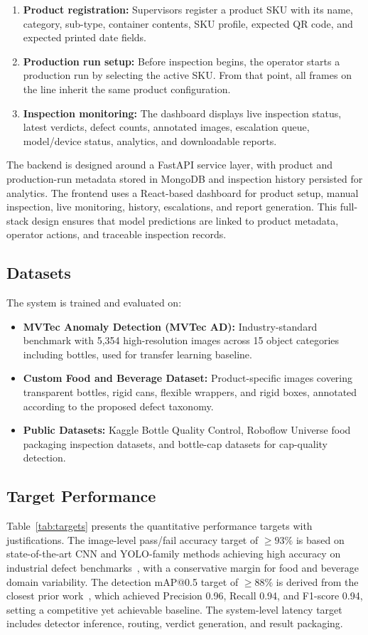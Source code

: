 \documentclass{ieeeaccess}
\begin{document}
\begin{enumerate}
    \item \textbf{Product registration:} Supervisors register a product SKU with its name, category, sub-type, container contents, SKU profile, expected QR code, and expected printed date fields.
    \item \textbf{Production run setup:} Before inspection begins, the operator starts a production run by selecting the active SKU. From that point, all frames on the line inherit the same product configuration.
    \item \textbf{Inspection monitoring:} The dashboard displays live inspection status, latest verdicts, defect counts, annotated images, escalation queue, model/device status, analytics, and downloadable reports.
\end{enumerate}

The backend is designed around a FastAPI service layer, with product and production-run metadata stored in MongoDB and inspection history persisted for analytics. The frontend uses a React-based dashboard for product setup, manual inspection, live monitoring, history, escalations, and report generation. This full-stack design ensures that model predictions are linked to product metadata, operator actions, and traceable inspection records.

\subsection{Datasets}
The system is trained and evaluated on:
\begin{itemize}
    \item \textbf{MVTec Anomaly Detection (MVTec AD):} Industry-standard benchmark with 5,354 high-resolution images across 15 object categories including bottles, used for transfer learning baseline.
    \item \textbf{Custom Food and Beverage Dataset:} Product-specific images covering transparent bottles, rigid cans, flexible wrappers, and rigid boxes, annotated according to the proposed defect taxonomy.
    \item \textbf{Public Datasets:} Kaggle Bottle Quality Control, Roboflow Universe food packaging inspection datasets, and bottle-cap datasets for cap-quality detection.
\end{itemize}

\subsection{Target Performance}
Table~\ref{tab:targets} presents the quantitative performance targets with justifications. The image-level pass/fail accuracy target of $\geq 93\%$ is based on state-of-the-art CNN and YOLO-family methods achieving high accuracy on industrial defect benchmarks~\cite{resnet50defect2025, defectdetection2024}, with a conservative margin for food and beverage domain variability. The detection mAP@0.5 target of $\geq 88\%$ is derived from the closest prior work~\cite{liu2025foodpkg}, which achieved Precision 0.96, Recall 0.94, and F1-score 0.94, setting a competitive yet achievable baseline. The system-level latency target includes detector inference, routing, verdict generation, and result packaging.
\end{document}
